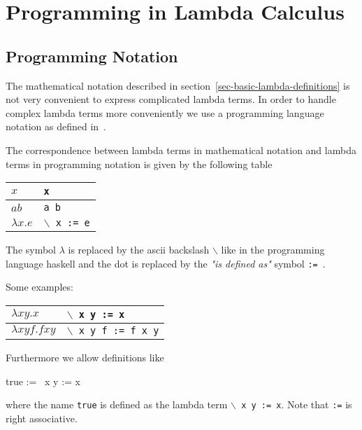 \documentclass[12pt]{article}
\begin{document}
\section{Programming in Lambda Calculus}
\label{sec-lambda-programming}








\subsection{Programming Notation}
\label{sec-programming-notation}

The mathematical notation described in
section~\ref{sec-basic-lambda-definitions} is not very convenient to express
complicated lambda terms. In order to handle complex lambda terms more
conveniently we use a programming language notation as defined
in~\cite{brandl-lambda-programming}.

The correspondence between lambda terms in mathematical notation and lambda
terms in programming notation is given by the following table

\begin{tabular}[t]{|l|l|}
    \hline
    $x$
    & {\tt x}
    \\ \hline
    $a b$
    & {\tt a b}
    \\ \hline
    $\lambda x. e$
    & {\tt $\backslash$ x := e}
    \\ \hline
\end{tabular}

The symbol $\lambda$ is replaced by the ascii backslash $\backslash$ like in the
programming language haskell and the dot
is replaced by the \emph{"is defined as"} symbol {\tt := }.

Some examples:

\begin{tabular}[t]{|l|l|}
    \hline
    $\lambda x y . x$
    & {\tt $\backslash$ x y := x}
    \\ \hline
    $\lambda x y f. f x y$
    & {\tt $\backslash$ x y f := f x y}
    \\ \hline
\end{tabular}

Furthermore we allow definitions like
\begin{lam}
    true := \ x y := x
\end{lam}
where the name {\tt true} is defined as the lambda term
{\tt $\backslash$ x y := x}. Note that {\tt :=} is right associative.
\end{document}

